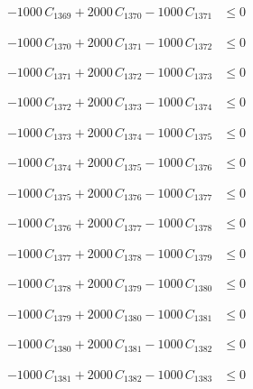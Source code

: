 \documentclass[a4paper,11pt]{article}
\begin{document}
\begin{align}
-1000\,C_{1369} + 2000\,C_{1370} - 1000\,C_{1371} &\leq 0 \nonumber
\end{align}

\begin{align}
-1000\,C_{1370} + 2000\,C_{1371} - 1000\,C_{1372} &\leq 0 \nonumber
\end{align}

\begin{align}
-1000\,C_{1371} + 2000\,C_{1372} - 1000\,C_{1373} &\leq 0 \nonumber
\end{align}

\begin{align}
-1000\,C_{1372} + 2000\,C_{1373} - 1000\,C_{1374} &\leq 0 \nonumber
\end{align}

\begin{align}
-1000\,C_{1373} + 2000\,C_{1374} - 1000\,C_{1375} &\leq 0 \nonumber
\end{align}

\begin{align}
-1000\,C_{1374} + 2000\,C_{1375} - 1000\,C_{1376} &\leq 0 \nonumber
\end{align}

\begin{align}
-1000\,C_{1375} + 2000\,C_{1376} - 1000\,C_{1377} &\leq 0 \nonumber
\end{align}

\begin{align}
-1000\,C_{1376} + 2000\,C_{1377} - 1000\,C_{1378} &\leq 0 \nonumber
\end{align}

\begin{align}
-1000\,C_{1377} + 2000\,C_{1378} - 1000\,C_{1379} &\leq 0 \nonumber
\end{align}

\begin{align}
-1000\,C_{1378} + 2000\,C_{1379} - 1000\,C_{1380} &\leq 0 \nonumber
\end{align}

\begin{align}
-1000\,C_{1379} + 2000\,C_{1380} - 1000\,C_{1381} &\leq 0 \nonumber
\end{align}

\begin{align}
-1000\,C_{1380} + 2000\,C_{1381} - 1000\,C_{1382} &\leq 0 \nonumber
\end{align}

\begin{align}
-1000\,C_{1381} + 2000\,C_{1382} - 1000\,C_{1383} &\leq 0 \nonumber
\end{align}
\end{document}
